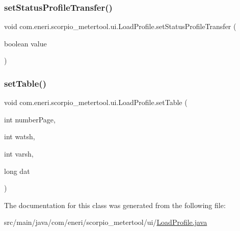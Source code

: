 \subsubsection{\texorpdfstring{set\+Status\+Profile\+Transfer()}{setStatusProfileTransfer()}}
{\footnotesize\ttfamily void com.\+eneri.\+scorpio\+\_\+metertool.\+ui.\+Load\+Profile.\+set\+Status\+Profile\+Transfer (\begin{DoxyParamCaption}\item[{boolean}]{value }\end{DoxyParamCaption})}

\mbox{\label{classcom_1_1eneri_1_1scorpio__metertool_1_1ui_1_1_load_profile_a3659fdc735b14235ef781413540251a9}} 
\subsubsection{\texorpdfstring{set\+Table()}{setTable()}}
{\footnotesize\ttfamily void com.\+eneri.\+scorpio\+\_\+metertool.\+ui.\+Load\+Profile.\+set\+Table (\begin{DoxyParamCaption}\item[{int}]{number\+Page,  }\item[{int}]{watsh,  }\item[{int}]{varsh,  }\item[{long}]{dat }\end{DoxyParamCaption})}



The documentation for this class was generated from the following file\+:\begin{DoxyCompactItemize}
\item 
src/main/java/com/eneri/scorpio\+\_\+metertool/ui/\hyperlink{_load_profile_8java}{Load\+Profile.\+java}\end{DoxyCompactItemize}

